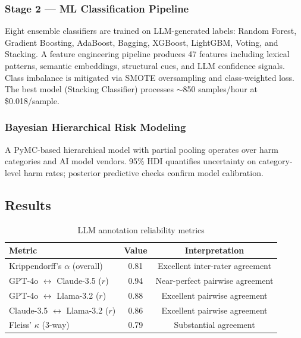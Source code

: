 \documentclass[11pt,a4paper]{article}
\begin{document}
\subsubsection{Stage 2 --- ML Classification Pipeline}

Eight ensemble classifiers are trained on LLM-generated labels: Random Forest, Gradient Boosting, AdaBoost, Bagging, XGBoost, LightGBM, Voting, and Stacking. A feature engineering pipeline produces 47 features including lexical patterns, semantic embeddings, structural cues, and LLM confidence signals. Class imbalance is mitigated via SMOTE oversampling and class-weighted loss. The best model (Stacking Classifier) processes $\sim$850 samples/hour at \$0.018/sample.

\subsubsection{Bayesian Hierarchical Risk Modeling}

A PyMC-based hierarchical model with partial pooling operates over harm categories and AI model vendors. 95\% HDI quantifies uncertainty on category-level harm rates; posterior predictive checks confirm model calibration.

\subsection{Results}

\begin{table}[H]
\centering
\caption{LLM annotation reliability metrics}
\begin{tabular}{lcc}
\toprule
\textbf{Metric} & \textbf{Value} & \textbf{Interpretation} \\
\midrule
Krippendorff's $\alpha$ (overall) & 0.81 & Excellent inter-rater agreement \\
GPT-4o $\leftrightarrow$ Claude-3.5 ($r$) & 0.94 & Near-perfect pairwise agreement \\
GPT-4o $\leftrightarrow$ Llama-3.2 ($r$) & 0.88 & Excellent pairwise agreement \\
Claude-3.5 $\leftrightarrow$ Llama-3.2 ($r$) & 0.86 & Excellent pairwise agreement \\
Fleiss' $\kappa$ (3-way) & 0.79 & Substantial agreement \\
\bottomrule
\end{tabular}
\label{tab:ai_reliability}
\end{table}
\end{document}
